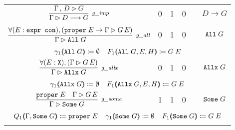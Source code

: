 \begin{tabular}{ c c c c c c }
\noalign{\smallskip} \hline \hline \noalign{\smallskip}
$\vcenter{\rlsimp{}}$ & 0 & 1 & 0 & \dyncon{} & $D \longrightarrow G$ \\
\noalign{\smallskip} \hline \noalign{\smallskip}
\multicolumn{6}{c}{$s_1 \coloneqq 0 \;\;\;\; \gamma_1 \args{D \longrightarrow G} \coloneqq \{ D \} \;\;\;\; F_1 \args{D \longrightarrow G} \coloneqq G$} \\
\noalign{\smallskip} \hline \hline \noalign{\smallskip}
$\vcenter{\rlsall{}}$ & 0 & 1 & 0 & \dyncon{} & $\texttt{All} \; G$ \\
\noalign{\smallskip} \hline \noalign{\smallskip}
\multicolumn{6}{c}{$s_1 \coloneqq 2 \;\;\;\; x_{1,1} \coloneqq E \;\;\;\; R_{1,1} \coloneqq \sltm{expr con} \;\;\;\; x_{1,2} \coloneqq H \;\;\;\; R_{1,2} \coloneqq \sltm{proper} \; E$} \\
\multicolumn{6}{c}{$\gamma_1 (\hspace{-0.35em} \langle \texttt{All} \; G \rangle \hspace{-0.35em}) \coloneqq \emptyset \;\;\;\; F_1 (\hspace{-0.35em} \langle \texttt{All} \; G , E , H \rangle \hspace{-0.35em}) \coloneqq G \; E$} \\
\noalign{\smallskip} \hline \hline \noalign{\smallskip}
$\vcenter{\rlsalls{}}$ & 0 & 1 & 0 & \dyncon{} & $\texttt{Allx} \; G$ \\
\noalign{\smallskip} \hline \noalign{\smallskip}
\multicolumn{6}{c}{$s_1 \coloneqq 1 \;\;\;\; x_{1,1} \coloneqq E \;\;\;\; R_{1,1} \coloneqq \sltm{X}$} \\
\multicolumn{6}{c}{$\gamma_1 (\hspace{-0.35em} \langle \texttt{Allx} \; G \rangle \hspace{-0.35em}) \coloneqq \emptyset \;\;\;\; F_1 (\hspace{-0.35em} \langle \texttt{Allx} \; G , E , H \rangle \hspace{-0.35em}) \coloneqq G \; E$} \\
\noalign{\smallskip} \hline \hline \noalign{\smallskip}
$\vcenter{\rlssome{}}$ & 1 & 1 & 0 & \dyncon{} & $\texttt{Some} \; G$ \\
\noalign{\smallskip} \hline \noalign{\smallskip}
\multicolumn{6}{c}{$s_1 \coloneqq 0$} \\
\multicolumn{6}{c}{$Q_1 \args{\dyncon{} , \sltm{Some} \; G} \coloneqq \sltm{proper} \; E \;\;\;\; \gamma_1 \args{\sltm{Some} \; G} \coloneqq \emptyset \;\;\;\; F_1 \args{\sltm{Some} \; G} \coloneqq G \; E$} \\
\noalign{\smallskip} \hline
\end{tabular}

